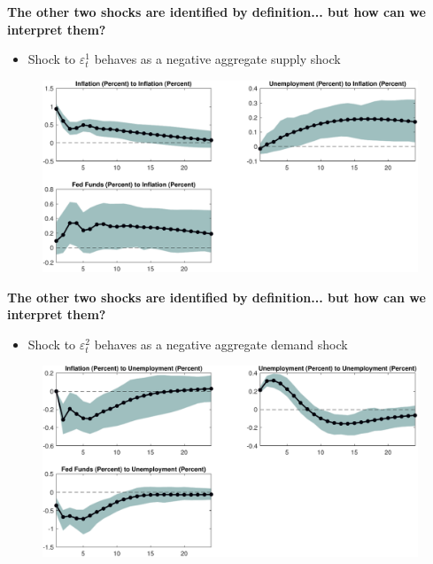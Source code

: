
\begin{frame}
{\textbf{The other two shocks are identified by definition... but how can we
interpret them?}}

\begin{itemize}
\item Shock to $\varepsilon^1_{t}$ behaves as a negative aggregate supply
shock
\end{itemize}

\begin{figure}[h]
\includegraphics[width=.75\textwidth]{SW_IR_1.pdf}
\end{figure}
\end{frame}


\begin{frame}
{\textbf{The other two shocks are identified by definition... but how can we
interpret them?}}

\begin{itemize}
\item Shock to $\varepsilon^2_{t}$ behaves as a negative aggregate demand
shock
\end{itemize}

\begin{figure}[h]
\includegraphics[width=.75\textwidth]{SW_IR_2.pdf}
\end{figure}
\end{frame}

